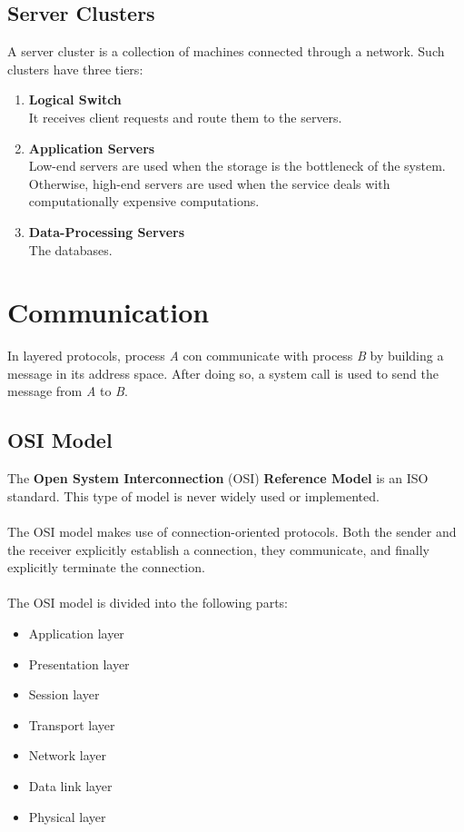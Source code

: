\documentclass{article}
\begin{document}
\subsection{Server Clusters}
A server cluster is a collection of machines connected through a network. Such clusters have three tiers:

\begin{enumerate}
	\item \textbf{Logical Switch} \\
	It receives client requests and route them to the servers.
	
	\item \textbf{Application Servers} \\
	Low-end servers are used when the storage is the bottleneck of the system. Otherwise, high-end servers are used when the service deals with computationally expensive computations.
	
	\item \textbf{Data-Processing Servers} \\
	The databases.
\end{enumerate}

\section{Communication}
In layered protocols, process \textit{A} con communicate with process \textit{B} by building a message in its address space. After doing so, a system call is used to send the message from \textit{A} to \textit{B}.

\subsection{OSI Model}
The \textbf{Open System Interconnection} (OSI) \textbf{Reference Model} is an ISO standard. This type of model is never widely used or implemented. \\ \\
The OSI model makes use of connection-oriented protocols. Both the sender and the receiver explicitly establish a connection, they communicate, and finally explicitly terminate the connection. \\ \\
The OSI model is divided into the following parts:

\begin{itemize}
	\item Application layer
	\item Presentation layer
	\item Session layer
	\item Transport layer
	\item Network layer
	\item Data link layer
	\item Physical layer
\end{itemize}
\end{document}
